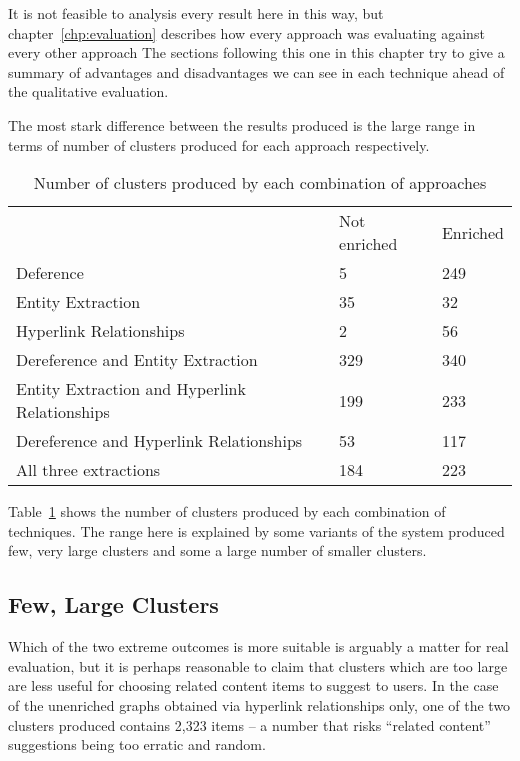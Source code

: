 It is not feasible to analysis every result here in this way, but
chapter~\ref{chp:evaluation} describes how every approach was
evaluating against every other approach The sections following
this one in this chapter try to give a summary of advantages and
disadvantages we can see in each technique ahead of the
qualitative evaluation.

The most stark difference between the results produced is the large
range in terms of number of clusters produced for each approach
respectively.

\begin{table}[h]
  \centering
  \caption{Number of clusters produced by each combination of approaches}
  \label{tbl:cluster-counts}
  \begin{tabular}{lll}
    & Not enriched & Enriched \\
    Deference                                     & 5            & 249      \\
    Entity Extraction                             & 35           & 32       \\
    Hyperlink Relationships                       & 2            & 56       \\
    Dereference and Entity Extraction             & 329          & 340      \\
    Entity Extraction and Hyperlink Relationships & 199          & 233      \\
    Dereference and Hyperlink Relationships       & 53           & 117      \\
    All three extractions                         & 184          & 223     
  \end{tabular}
\end{table}

Table~\ref{tbl:cluster-counts} shows the number of clusters produced
by each combination of techniques. The range here is explained by
some variants of the system produced few, very large clusters and
some a large number of smaller clusters.

\subsection{Few, Large Clusters}
\label{sec:few-large}

Which of the two extreme outcomes is more suitable is arguably a
matter for real evaluation, but it is perhaps reasonable to claim that
clusters which are too large are less useful for choosing related
content items to suggest to users. In the case of the unenriched graphs
obtained via hyperlink relationships only, one of the two clusters
produced contains 2,323 items -- a number that risks
``related content'' suggestions being too erratic and random.

